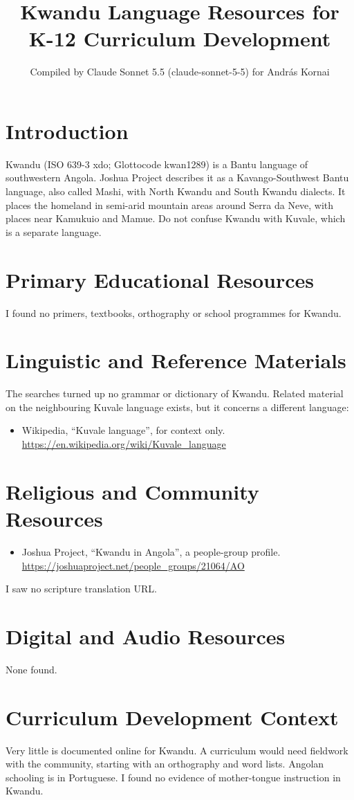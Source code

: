 \documentclass[12pt]{article}
\title{Kwandu Language Resources for K-12 Curriculum Development}
\author{Compiled by Claude Sonnet 5.5 (claude-sonnet-5-5) for Andr\'as Kornai}
\date{}
\begin{document}
\maketitle

\section{Introduction}
Kwandu (ISO 639-3 xdo; Glottocode kwan1289) is a Bantu language of southwestern Angola. Joshua Project describes it as a Kavango-Southwest Bantu language, also called Mashi, with North Kwandu and South Kwandu dialects. It places the homeland in semi-arid mountain areas around Serra da Neve, with places near Kamukuio and Mamue. Do not confuse Kwandu with Kuvale, which is a separate language.

\section{Primary Educational Resources}
I found no primers, textbooks, orthography or school programmes for Kwandu.

\section{Linguistic and Reference Materials}
The searches turned up no grammar or dictionary of Kwandu. Related material on the neighbouring Kuvale language exists, but it concerns a different language:
\begin{itemize}
\item Wikipedia, ``Kuvale language'', for context only. \url{https://en.wikipedia.org/wiki/Kuvale_language}
\end{itemize}

\section{Religious and Community Resources}
\begin{itemize}
\item Joshua Project, ``Kwandu in Angola'', a people-group profile. \url{https://joshuaproject.net/people_groups/21064/AO}
\end{itemize}
I saw no scripture translation URL.

\section{Digital and Audio Resources}
None found.

\section{Curriculum Development Context}
Very little is documented online for Kwandu. A curriculum would need fieldwork with the community, starting with an orthography and word lists. Angolan schooling is in Portuguese. I found no evidence of mother-tongue instruction in Kwandu.
\end{document}

